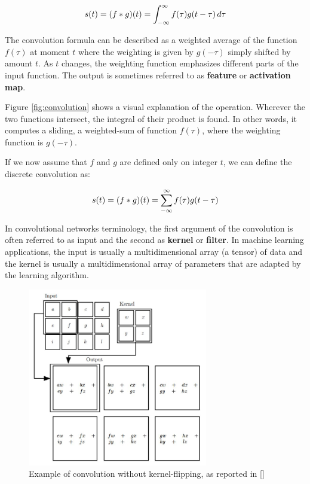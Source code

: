 \begin{equation} \notag
	s(t) = (f * g)(t) = \int_{-\infty}^{\infty}f(\tau)g(t-\tau)\,d\tau
\end{equation}

The convolution formula can be described as a weighted average of the function $f(\tau)$ at moment $t$ where the weighting is given by $g(-\tau)$ simply shifted by amount $t$. As $t$ changes, the weighting function emphasizes different parts of the input function. The output is sometimes referred to as \textbf{feature} or  \textbf{activation map}.

Figure \ref{fig:convolution} shows a visual explanation of the operation. Wherever the two functions intersect, the integral of their product is found. In other words, it computes a sliding, \ie  a weighted-sum of function $f(\tau)$, where the weighting function is $g(-\tau)$.

If we now assume that $f$ and $g$ are defined only on integer $t$, we
can define the discrete convolution as:

\begin{equation} \notag
	s(t) = (f * g)(t) = \sum_{-\infty}^{\infty}f(\tau)g(t-\tau)
\end{equation}

In convolutional networks terminology, the first argument of the convolution is often referred to as input and the second as \textbf{kernel} or \textbf{filter}. In machine learning applications, the input is usually a multidimensional array (\ie a tensor) of data and the kernel is usually a multidimensional array of parameters that are adapted by the learning algorithm.

\begin{figure}[ht]
	\centering
	\includegraphics[width=0.7\textwidth]{Images/convolution_example}
	\caption{Example of convolution without kernel-flipping, as reported in [\cite{Goodfellow-et-al-2016}]}\label{fig:convolution_example}
\end{figure}

